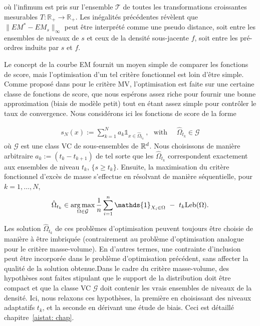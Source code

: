 où l'infimum est pris sur l'ensemble $ \mathcal {T} $ de toutes les transformations croissantes mesurables $T: \mathbb {R} _ + \rightarrow \mathbb {R} _ + $.
Les inégalités précédentes révèlent que $ \| EM ^ * - EM_s \| _ \infty $ peut être interprété comme une pseudo distance, soit entre les ensembles de niveaux de $ s $ et ceux de la densité sous-jacente $ f $, soit entre les pré-ordres induits par $ s $ et $ f $.

Le concept de la courbe EM fournit un moyen simple de comparer les fonctions de score, mais l'optimisation d'un tel critère fonctionnel est loin d'être simple. Comme proposé dans \cite {CLEM13} pour le critère MV, l'optimisation est faite sur une certaine classe de fonctions de score, que nous espérons assez riche pour fournir une bonne approximation (biais de modèle petit) tout en étant assez simple pour contrôler le taux de convergence. Nous considérons ici les fonctions de score de la forme

\begin{align*}
s_N(x):= \sum_{k=1}^N a_k \mathds{1}_{x \in \hat{\Omega}_{t_k} }~, ~~~\text{with ~~~} \hat{\Omega}_{t_k}  \in \mathcal{G}
\end{align*}
où $\mathcal{G}$ est une class VC de sous-ensembles de $\mathbb{R}^d$.
Nous choisissons de manière arbitraire $a_k:= (t_k-t_{k+1})$ de tel sorte que les $\hat{\Omega}_{t_k}$ correspondent exactement aux ensembles de niveau $t_k$, $\{s \ge t_k\}$. Ensuite, la maximisation du critère fonctionnel d'excès de masse s'effectue en résolvant de manière séquentielle, pour $k=1,\ldots,N$,
\begin{align*}
\hat \Omega_{t_k} \in \argmax_{\Omega \in \mathcal{G}} \frac{1}{n}\sum_{i=1}^n\mathds{1}_{X_i \in \Omega}~-~t_k \leb(\Omega).
\end{align*}

Les solution $ \hat \Omega_ {t_k} $ de ces problèmes d'optimisation peuvent toujours être choisie de manière à être imbriquée (contrairement au problème d'optimisation analogue pour le critère masse-volume). En d'autres termes, une contrainte d'inclusion peut être incorporée dans le problème d'optimisation précédent, sans affecter la qualité de la solution obtenue.Dans le cadre du critère masse-volume, des hypothèses sont faites stipulant que le support de la distribution doit être compact et que la classe VC $ \mathcal {G} $ doit contenir les vrais ensembles de niveaux de la densité. Ici, nous relaxons ces hypothèses, la première en choisissant des niveaux adaptatifs $ t_k $, et la seconde en dérivant une étude de biais. Ceci est détaillé chapitre~\ref{aistat: chap}.



